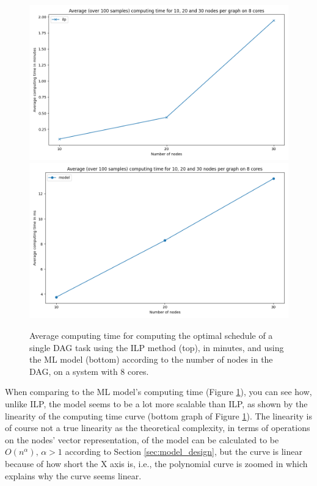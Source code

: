 \begin{figure}
    \centering
    \includegraphics[width=\linewidth]{images/result_computing_time_ilp_m8.png}
    \includegraphics[width=\linewidth]{images/result_computing_time_model_m8.png}
    \caption{Average computing time for computing the optimal schedule
    of a single DAG task using the ILP method (top), in minutes,
    and using the ML model (bottom) according to 
    the number of nodes in the DAG, on a system with 8 cores.}
    \label{fig:compute_time_ilp_model}
\end{figure}

When comparing to the ML model's computing time (Figure \ref{fig:compute_time_ilp_model}),
you can see how, unlike ILP, the model seems to be a lot more scalable
than ILP, as shown by the linearity of the computing time curve (bottom graph of Figure \ref{fig:compute_time_ilp_model}).
The linearity is of course not a true linearity as the theoretical complexity,
in terms of operations on the nodes' vector representation,
of the model can be calculated to be $O(n^{\alpha}),\, \alpha > 1$ according to Section \ref{sec:model_design},
but the curve is linear because of how short the X axis is, i.e.,
the polynomial curve is zoomed in which explains why the curve seems linear.

